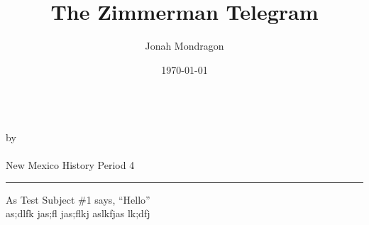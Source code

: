 \documentclass[12pt]{article}
\newcommand{\PutTitle}[1]
{
    \begin{center}
        {\huge\bfseries\thetitle}\\
        by \theauthor\\
        \thedate\\
        #1        
    \end{center}
    \hrule
    \vspace{2ex}
}
\begin{document}
\title{The Zimmerman Telegram}
\author{Jonah Mondragon}
\date{\today}
\PutTitle{New Mexico History Period 4}

As Test Subject \#1 says, ``Hello''\autocite{ZimmermanTelegram}\\
as;dlfk jas;fl jas;flkj aslkfjas lk;dfj

\pagestyle{headings}
\newpage

\printbibliography
\end{document}
